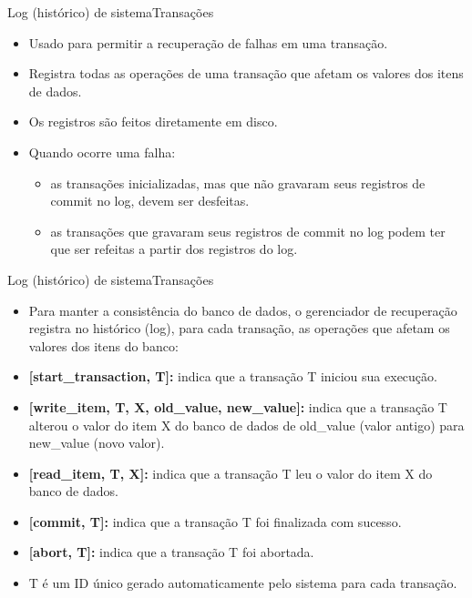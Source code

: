 \documentclass[t]{beamer}
\begin{document}

\begin{ftst}{Log (histórico) de sistema}{Transações}
\begin{itemize}
    \item Usado para permitir a recuperação de falhas em uma transação.
    \item Registra todas as operações de uma transação que afetam os valores dos itens de dados.
    \item Os registros são feitos diretamente em disco.
    \item Quando ocorre uma falha:
    \begin{itemize}
        \item as transações inicializadas, mas que não gravaram seus registros de commit no log, devem ser desfeitas.
        \item as transações que gravaram seus registros de commit no log podem ter que ser refeitas a partir dos registros do log.
    \end{itemize}
\end{itemize}
\end{ftst}


\begin{ftst}{Log (histórico) de sistema}{Transações}
\small
\begin{itemize}
    \item Para manter a consistência do banco de dados, o gerenciador de recuperação registra no histórico (log), para cada transação, as operações que afetam os valores dos itens do banco:
    \vone
    \item[] \textbf{[start\_transaction, T]:} indica que a transação T iniciou sua execução.
    \item[] \textbf{[write\_item, T, X, old\_value, new\_value]:} indica que a transação T alterou o valor do item X do banco de dados de old\_value (valor antigo) para new\_value (novo valor).
    \item[] \textbf{[read\_item, T, X]:} indica que a transação T leu o valor do item X do banco de dados.
    \item[] \textbf{[commit, T]: }indica que a transação T foi finalizada com
    sucesso.
    \item[] \textbf{[abort, T]:} indica que a transação T foi abortada.
    \vone
    \item T é um ID único gerado automaticamente pelo sistema para cada transação.
\end{itemize}

\end{ftst}
\end{document}
